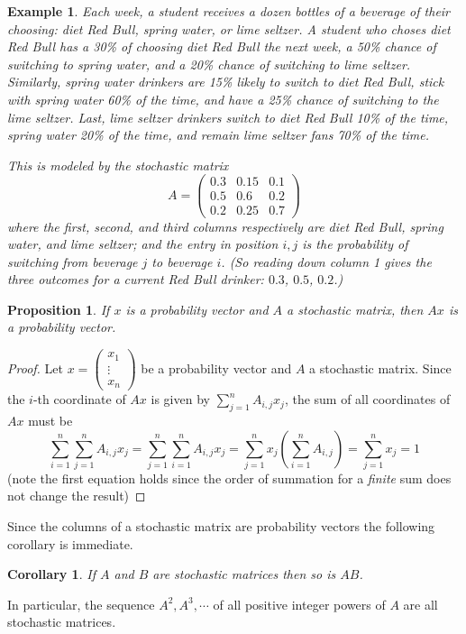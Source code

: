\documentclass[12pt]{article}
\numberwithin{equation}{subsection}
\numberwithin{figure}{subsection}
\newtheorem{prop}[subsection]{Proposition}
\newtheorem{corr}[subsection]{Corollary}
\theoremstyle{note}
\newtheorem{example}[subsection]{Example}
\begin{document}
\begin{example} \label{ex-redbull}
Each week, a student receives a dozen bottles of a beverage of their choosing: diet Red Bull, spring water, or lime seltzer. A student who choses diet Red Bull has a 30\% of choosing diet Red Bull the next week, a 50\% chance of switching to spring water, and a 20\% chance of switching to lime seltzer. Similarly, spring water drinkers are 15\% likely to switch to diet Red Bull, stick with spring water 60\% of the time, and have a 25\% chance of switching to the lime seltzer. Last, lime seltzer drinkers switch to diet Red Bull 10\% of the time, spring water 20\% of the time, and remain lime seltzer fans 70\% of the time. 

This is modeled by the stochastic matrix \begin{equation} A=\begin{pmatrix} 0.3 &0.15  & 0.1 \\ 0.5 & 0.6 & 0.2 \\ 0.2 & 0.25 & 0.7\end{pmatrix}\end{equation} where the first, second, and third columns respectively are diet Red Bull, spring water, and lime seltzer; and the entry in position $i,j$ is the probability of switching from beverage $j$ to beverage $i$. (So reading \textit{down} column 1 gives the three outcomes for a current Red Bull drinker: $0.3$, $0.5$, $0.2$.)
\end{example}

\begin{prop} \label{prop-pv} If $x$ is a probability vector and $A$ a stochastic matrix, then $Ax$ is a probability vector. \end{prop}
\begin{proof}
Let $x=\begin{pmatrix} x_1 \\ \vdots \\ x_n\end{pmatrix}$ be a probability vector and $A$ a stochastic matrix. Since the $i$-th coordinate of $Ax$ is given by $ \sum_{j=1}^n A_{i,j} x_j$, the sum of all coordinates of $Ax$ must be \[ \sum_{i=1}^n \sum_{j=1}^n A_{i,j}x_j = \sum_{j=1}^n \sum_{i=1}^n A_{i,j}x_j=\sum_{j=1}^nx_j \left( \sum_{i=1}^n A_{i,j}\right)=\sum_{j=1}^n x_j=1\] 
(note the first equation holds since the order of summation for a \textit{finite} sum does not change the result)\end{proof}

Since the columns of a stochastic matrix are probability vectors the following corollary is immediate. 
\begin{corr} If $A$ and $B$ are stochastic matrices then so is $AB$. \end{corr}
In particular, the sequence $A^2, A^3,\cdots$ of all positive integer powers of $A$ are all stochastic matrices. 
\end{document}

